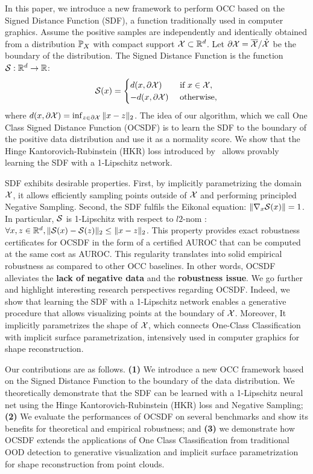 In this paper, we introduce a new framework to perform OCC based on the Signed Distance Function (SDF), a function traditionally used in computer graphics. Assume the positive samples are independently and identically obtained from a distribution $\mathbb{P}_X$ with compact support $\mathcal{X}\subset\mathbb{R}^d$. Let $\partial\mathcal{X}=\overline{\mathcal{X}}/\mathring{\mathcal{X}}$ be the boundary of the distribution. The Signed Distance Function is the function $\mathcal{S}:\mathbb{R}^d\rightarrow\mathbb{R}$:
\begin{equation}
\mathcal{S}(x)=\begin{cases}
d(x,\partial\mathcal{X})&\text{ if }x\in\mathcal{X},\\
-d(x,\partial\mathcal{X})&\text{ otherwise,}\\
\end{cases}
\end{equation}
where $d(x,\partial\mathcal{X})=\inf_{z\in\partial\mathcal{X}} \|x-z\|_2$. The idea of our algorithm, which we call One Class Signed Distance Function (OCSDF) is to learn the SDF to the boundary of the positive data distribution and use it as a normality score. We show that the Hinge Kantorovich-Rubinstein (HKR) loss introduced by~\cite{serrurier2021achieving} allows provably learning the SDF with a 1-Lipschitz network. 

SDF exhibits desirable properties. First, by implicitly parametrizing the domain $\mathcal{X}$, it allows efficiently sampling points outside of $\mathcal{X}$ and performing principled Negative Sampling. Second, the SDF fulfils the Eikonal equation: $\|\nabla_x \mathcal{S}(x)\|=1$. In particular, $\mathcal{S}$ is 1-Lipschitz with respect to $l2$-nom : $\forall x,z\in\mathbb{R}^d, \|\mathcal{S}(x)-\mathcal{S}(z)\|_2\leq \|x-z\|_2$. This property provides exact robustness certificates for OCSDF in the form of a certified AUROC that can be computed at the same cost as AUROC. This regularity translates into solid empirical robustness as compared to other OCC baselines. In other words, OCSDF alleviates the \textbf{lack of negative data} and the \textbf{robustness issue}. We go further and highlight interesting research perspectives regarding OCSDF. Indeed, we show that learning the SDF with a 1-Lipschitz network enables a generative procedure that allows visualizing points at the boundary of $\mathcal{X}$. Moreover, It implicitly parametrizes the shape of $\mathcal{X}$, which connects One-Class Classification with implicit surface parametrization, intensively used in computer graphics for shape reconstruction. 

Our contributions are as follows. \textbf{(1)} We introduce a new OCC framework based on the Signed Distance Function to the boundary of the data distribution. We theoretically demonstrate that the SDF can be learned with a 1-Lipschitz neural net using the Hinge Kantorovich-Rubinstein (HKR) loss and Negative Sampling; \textbf{(2)} We evaluate the performances of OCSDF on several benchmarks and show its benefits for theoretical and empirical robustness; and \textbf{(3)} we demonstrate how OCSDF extends the applications of One Class Classification from traditional OOD detection to generative visualization and implicit surface parametrization for shape reconstruction from point clouds.



